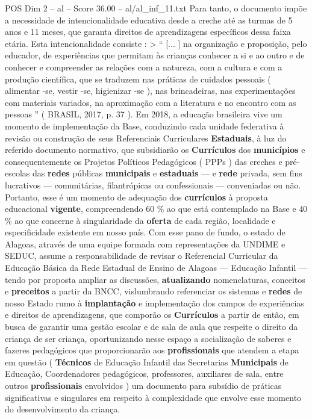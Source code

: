 \begin{textsample}{POS Dim 2 – al – Score 36.00 – al/al\_inf\_11.txt}
Para tanto, o documento impõe a necessidade de intencionalidade educativa desde a creche até as turmas de 5 anos e 11 meses, que garanta direitos de aprendizagens específicos dessa faixa etária.
Esta intencionalidade consiste : > “ [... ] na organização e proposição, pelo educador, de experiências que permitam às crianças conhecer a si e ao outro e de conhecer e compreender as relações com a natureza, com a cultura e com a produção científica, que se traduzem nas práticas de cuidados pessoais ( alimentar -se, vestir -se, higienizar -se ), nas brincadeiras, nas experimentações com materiais variados, na aproximação com a literatura e no encontro com as pessoas ” ( BRASIL, 2017, p. 37 ).
Em 2018, a educação brasileira vive um momento de implementação da Base, conduzindo cada unidade federativa à revisão ou construção de seus Referenciais Curriculares \textbf{Estaduais}, à luz do referido documento normativo, que subsidiarão os \textbf{Currículos} dos \textbf{municípios} e consequentemente os Projetos Políticos Pedagógicos ( PPPs ) das creches e pré-escolas das \textbf{redes} públicas \textbf{municipais} e \textbf{estaduais} — e \textbf{rede} privada, sem fins lucrativos — comunitárias, filantrópicas ou confessionais — conveniadas ou não.
Portanto, esse é um momento de adequação dos \textbf{currículos} à proposta educacional \textbf{vigente}, compreendendo 60 \% ao que está contemplado na Base e 40 \% ao que concerne à singularidade da \textbf{oferta} de cada região, localidade e especificidade existente em nosso país.
Com esse pano de fundo, o estado de Alagoas, através de uma equipe formada com representações da UNDIME e SEDUC, assume a responsabilidade de revisar o Referencial Curricular da Educação Básica da Rede Estadual de Ensino de Alagoas — Educação Infantil — tendo por proposta ampliar as discussões, \textbf{atualizando} nomenclaturas, conceitos e \textbf{preceitos} a partir da BNCC, vislumbrando referenciar os sistemas e \textbf{redes} de nosso Estado rumo à \textbf{implantação} e implementação dos campos de experiências e direitos de aprendizagens, que comporão os \textbf{Currículos} a partir de então, em busca de garantir uma gestão escolar e de sala de aula que respeite o direito da criança de ser criança, oportunizando nesse espaço a socialização de saberes e fazeres pedagógicos que proporcionarão aos \textbf{profissionais} que atendem a etapa em questão ( \textbf{Técnicos} de Educação Infantil das Secretarias \textbf{Municipais} de Educação, Coordenadores pedagógicos, professores, auxiliares de sala, entre outros \textbf{profissionais} envolvidos ) um documento para subsídio de práticas significativas e singulares em respeito à complexidade que envolve esse momento do desenvolvimento da criança.

\end{textsample}
